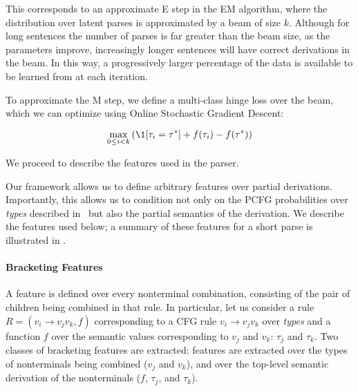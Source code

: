 This corresponds to an approximate E step in the EM algorithm, where the
  distribution over latent parses is approximated by a beam of size $k$.
Although for long sentences the number of parses is far greater than the
  beam size, as the parameters improve, increasingly longer sentences will
  have correct derivations in the beam.
In this way, a progressively larger percentage of the data is available to be
	learned from at each iteration.

To approximate the M step, 
  we define a multi-class hinge loss over the beam, which we can optimize
  using Online Stochastic Gradient Descent:

\begin{equation}
\max_{0 \leq i < k} \left(
  \1[\tau_i = \tau^*] + f(\tau_i) - f(\tau^*)
\right)
\end{equation}

We proceed to describe the features used in the parser.


Our framework allows us to define arbitrary features over partial derivations.
Importantly, this allows us to condition not only on the PCFG probabilities
  over \textit{types} described in \me\ but also the partial semantics of the
  derivation.
We describe the features used below; a summary of these features
  for a short parse is illustrated in .

\paragraph{Bracketing Features}
A feature is defined over every nonterminal combination,
  consisting of the pair of children being combined in that rule.
In particular, let us consider a rule
  \mbox{$R = (v_i \rightarrow v_j v_k, f)$} corresponding to a CFG rule
  \mbox{$v_i \rightarrow v_j v_k$} over \textit{types} and a function $f$
  over the semantic values corresponding to 
  $v_j$ and $v_k$: $\tau_j$ and $\tau_k$.
Two classes of bracketing features are extracted:
  features are extracted over the types of nonterminals being combined
    ($v_j$ and $v_k$),
  and over the top-level semantic derivation of the nonterminals
    ($f$, $\tau_j$, and $\tau_k$).

